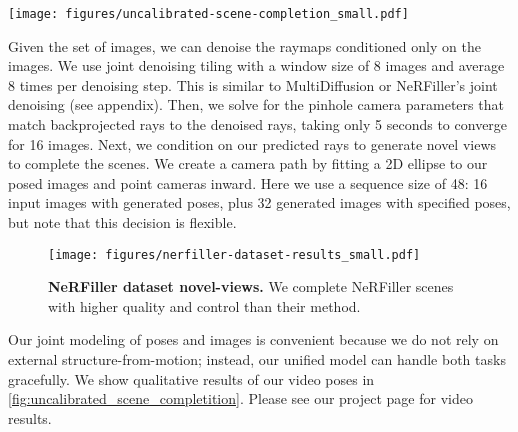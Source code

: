 \begin{figure*}[t]
\centering
\texttt{[image: figures/uncalibrated-scene-completion\_small.pdf]}
\vspace{-15px}
\caption{\label{fig:uncalibrated_scene_completition}%
    \textbf{Uncalibrated scene completion.}
    We capture some scenes with an iPhone 14 Pro and run our framework. We start from 16 uncalibrated and unposed images (left), and we use our model to both predict camera pose (middle) and generate completed views (right).
    We show our predicted cameras in red compared and unknown views we will sample in black.
    Our cameras are plausible and useful for conditioning on to generate new views.
    We show just 4 views here and the full videos on the project page.
}
\vspace{-15px}
\end{figure*}


%
Given the set of images, we can denoise the raymaps conditioned only on the images.
We use joint denoising tiling with a window size of 8 images and average 8 times per denoising step.
This is similar to MultiDiffusion \cite{bar2023multidiffusion} or NeRFiller's joint denoising \cite{weber2024nerfiller} (see appendix).
Then, we solve for the pinhole camera parameters that match backprojected rays to the denoised rays, taking only 5 seconds to converge for 16 images.
Next, we condition on our predicted rays to generate novel views to complete the scenes.
We create a camera path by fitting a 2D ellipse to our posed images and point cameras inward.
Here we use a sequence size of 48: 16 input images with generated poses, plus 32 generated images with specified poses, but note that this decision is flexible.

\begin{figure}[t]
\centering
\texttt{[image: figures/nerfiller-dataset-results\_small.pdf]}
\vspace{-15px}
\caption{\label{fig:nerfiller_results}%
    \textbf{NeRFiller dataset novel-views.}
    We complete NeRFiller scenes \cite{weber2024nerfiller} with higher quality and control than their method.
}
\vspace{-1em}
\end{figure}


%
Our joint modeling of poses and images is convenient because we do not rely on external structure-from-motion; instead, our unified model can handle both tasks gracefully.
We show qualitative results of our video poses in \cref{fig:uncalibrated_scene_completition}.
Please see our project page for video results.

